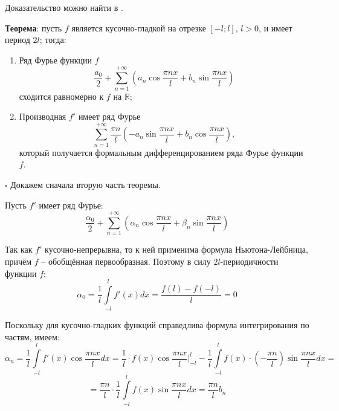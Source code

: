 \documentclass[12pt, a4paper, reqno]{article}
\begin{document}
    Доказательство можно найти в \cite{petrovich-3}.

    \textbf{Теорема}: пусть $f$ является кусочно-гладкой на отрезке $[-l; l]$, $l > 0$, и имеет
    период $2l$; тогда:
    \begin{enumerate}
        \item Ряд Фурье функции $f$
        \begin{equation*}
            \frac{a_0}{2} + \sum\limits_{n = 1}^{+\infty}
            \left(
                a_n \cos{\frac{\pi n x}{l}} + b_n \sin{\frac{\pi n x}{l}}
            \right)
        \end{equation*}
        сходится равномерно к $f$ на $\mathbb{R}$;
        \item Производная $f'$ имеет ряд Фурье
        \begin{equation*}
            \sum\limits_{n = 1}^{+\infty}\frac{\pi n}{l}
            \left(
                -a_n \sin{\frac{\pi n x}{l}} + b_n \cos{\frac{\pi n x}{l}}
            \right),
        \end{equation*}
        который получается формальным дифференцированием ряда Фурье функции $f$.
    \end{enumerate}

    $\square$
    Докажем сначала вторую часть теоремы.

    Пусть $f'$ имеет ряд Фурье:
    \begin{equation*}
        \frac{\alpha_0}{2} + \sum\limits_{n = 1}^{+\infty}
        \left(
            \alpha_n \cos{\frac{\pi n x}{l}} + \beta_n \sin{\frac{\pi n x}{l}}
        \right)
    \end{equation*}

    Так как $f'$ кусочно-непрерывна, то к ней применима формула Ньютона-Лейбница, причём $f$ --
    обобщённая первообразная. Поэтому в силу $2l$-периодичности функции $f$:
    \begin{equation*}
        \alpha_0 = \frac{1}{l}\int\limits_{-l}^{l} f'(x)dx = \frac{f(l) - f(-l)}{l} = 0
    \end{equation*}

    Поскольку для кусочно-гладких функций справедлива формула интегрирования по частям, имеем:
    \begin{equation*}
        \alpha_n = \frac{1}{l}\int\limits_{-l}^{l} f'(x) \cos{\frac{\pi nx}{l}}dx =
        \frac{1}{l} \cdot f(x)\cos{\frac{\pi nx}{l}}\Big|_{-l}^{l} -
            \frac{1}{l}\int\limits_{-l}^{l} f(x) \cdot \left(-\frac{\pi n}{l}\right)\sin{\frac{\pi n x}{l}}dx =
    \end{equation*}
    \begin{equation*}
        = \frac{\pi n}{l} \cdot \frac{1}{l}\int\limits_{-l}^{l} f(x) \sin{\frac{\pi n x}{l}}dx =
        \frac{\pi n}{l} b_n
    \end{equation*}
\end{document}
